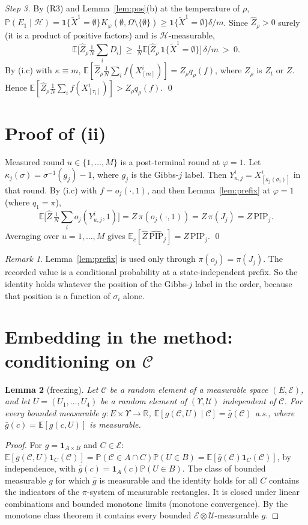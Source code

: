 \documentclass[11pt]{article}
\newtheorem{lemma}{Lemma}[section]
\theoremstyle{remark}
\newtheorem{remark}[lemma]{Remark}
\newcommand{\E}{\mathbb{E}}
\renewcommand{\P}{\mathbb{P}}
\newcommand{\R}{\mathbb{R}}
\newcommand{\cC}{\mathcal{C}}
\newcommand{\cH}{\mathcal{H}}
\newcommand{\Zh}{\widehat Z}
\newcommand{\PIPh}{\widehat{\mathrm{PIP}}}
\newcommand{\PIP}{\mathrm{PIP}}
\newcommand{\ind}{\mathbf 1}
\newcommand{\Om}{\Omega}
\begin{document}
\emph{Step 3.} By (R3) and Lemma~\ref{lem:pos}(b) at the temperature of $\rho$, $\P(E_1\mid\cH)=\ind\{\tilde X^1=\emptyset\}K_\varphi(\emptyset,\Om\setminus\{\emptyset\})\ge\ind\{\tilde X^1=\emptyset\}\delta/m$. Since $\Zh_\rho>0$ surely (it is a product of positive factors) and is $\cH$-measurable,
\[ \E\Big[\Zh_\rho\tfrac1N\textstyle\sum_iD_i\Big]\ \ge\ \tfrac1N\E\big[\Zh_\rho\,\ind\{\tilde X^1=\emptyset\}\big]\,\delta/m\ >\ 0 . \]
By (i.c) with $\kappa\equiv m$, $\E[\Zh_\rho\frac1N\sum_if(X^i_{[m]})]=Z_\rho q_\rho(f)$, where $Z_\rho$ is $Z_t$ or $Z$. Hence $\E[\Zh_\rho\frac1N\sum_if(X^i_{[\tau_i]})]>Z_\rho q_\rho(f)$. \qed

\section{Proof of (ii)}

Measured round $u\in\{1,\dots,M\}$ is a post-terminal round at $\varphi=1$. Let $\kappa_j(\sigma)=\sigma^{-1}(g_j)-1$, where $g_j$ is the Gibbs-$j$ label. Then $Y^i_{u,j}=X^i_{[\kappa_j(\sigma_i)]}$ in that round. By (i.c) with $f=o_j(\cdot,1)$, and then Lemma~\ref{lem:prefix} at $\varphi=1$ (where $q_1=\pi$),
\[ \E\Big[\Zh\,\tfrac1N\textstyle\sum_io_j(Y^i_{u,j},1)\Big]=Z\,\pi(o_j(\cdot,1))=Z\,\pi(J_j)=Z\,\PIP_j . \]
Averaging over $u=1,\dots,M$ gives $\E_c[\Zh\,\PIPh_j]=Z\,\PIP_j$. \qed

\begin{remark}
Lemma~\ref{lem:prefix} is used only through $\pi(o_j)=\pi(J_j)$. The recorded value is a conditional probability at a state-independent prefix. So the identity holds whatever the position of the Gibbs-$j$ label in the order, because that position is a function of $\sigma_i$ alone.
\end{remark}

\section{Embedding in the method: conditioning on $\cC$}

\begin{lemma}[freezing]\label{lem:freeze}
Let $\cC$ be a random element of a measurable space $(E,\mathcal E)$, and let $U=(U_1,\dots,U_4)$ be a random element of $(\Upsilon,\mathcal U)$ independent of $\cC$. For every bounded measurable $g:E\times\Upsilon\to\R$, $\E[g(\cC,U)\mid\cC]=\bar g(\cC)$ a.s., where $\bar g(c)=\E[g(c,U)]$ is measurable.
\end{lemma}
\begin{proof}
For $g=\ind_{A\times B}$ and $C\in\mathcal E$: $\E[g(\cC,U)\ind_C(\cC)]=\P(\cC\in A\cap C)\P(U\in B)=\E[\bar g(\cC)\ind_C(\cC)]$, by independence, with $\bar g(c)=\ind_A(c)\P(U\in B)$. The class of bounded measurable $g$ for which $\bar g$ is measurable and the identity holds for all $C$ contains the indicators of the $\pi$-system of measurable rectangles. It is closed under linear combinations and bounded monotone limits (monotone convergence). By the monotone class theorem it contains every bounded $\mathcal E\otimes\mathcal U$-measurable $g$.
\end{proof}
\end{document}
